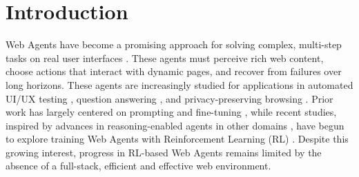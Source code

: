 \documentclass{article}
\begin{document}
\section{Introduction}




Web Agents have become a promising approach for solving complex, multi-step tasks on real user interfaces \cite{weiWebAgentR1TrainingWeb2025,gurRealWorldWebAgentPlanning2023}.
These agents must perceive rich web content, choose actions that interact with dynamic pages, and recover from failures over long horizons. 
These agents are increasingly studied for applications in automated UI/UX testing \cite{luUXAgentLLMAgentBased2025}, question answering \cite{nakanoWebGPTBrowserassistedQuestionanswering2022}, and privacy-preserving browsing \cite{chenEmpathyBasedSandboxApproach2024}.
Prior work has largely centered on prompting \cite{sodhiStePStackedLLM2024,maLASERLLMAgent2024} and fine-tuning \cite{luPromptingNotAll2025}, while recent studies, inspired by advances in reasoning-enabled agents in other domains \cite{deepseek-aiDeepSeekR1IncentivizingReasoning2025}, have begun to explore training Web Agents with Reinforcement Learning (RL) \cite{weiWebAgentR1TrainingWeb2025,qiWebRLTrainingLLM2025}. 
Despite this growing interest, progress in RL-based Web Agents remains limited by the absence of a full-stack, efficient and effective web environment.
\end{document}
